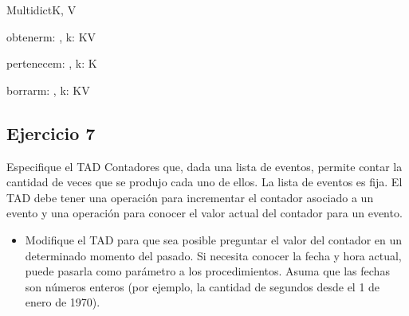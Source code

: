 \begin{enumerate}[label=\alph*)]
\begin{tad}{Multidict}{K, V}
		      \begin{proc}{obtener}{\In m: \tadtype, \In k: K}{V}
		      \end{proc}

		      \begin{proc}{pertenece}{\In m: \tadtype, \In k: K}{\bool}
		      \end{proc}

		      \begin{proc}{borrar}{\Inout m: \tadtype, \In k: K}{V}
		      \end{proc}
	      \end{tad}
\end{enumerate}

\subsection{Ejercicio 7}
Especifique el TAD Contadores que, dada una lista de eventos, permite contar la cantidad de veces que se produjo cada uno de ellos. La lista de eventos es fija. El TAD debe tener una operación para incrementar el contador asociado a un evento y una operación para conocer el valor actual del contador para un evento.

\begin{itemize}
	\item Modiﬁque el TAD para que sea posible preguntar el valor del contador en un determinado momento del pasado. Si necesita conocer la fecha y hora actual, puede pasarla como parámetro a los procedimientos. Asuma que las fechas son números enteros (por ejemplo, la cantidad de segundos desde el 1 de enero de 1970).
\end{itemize}

\pagebreak

